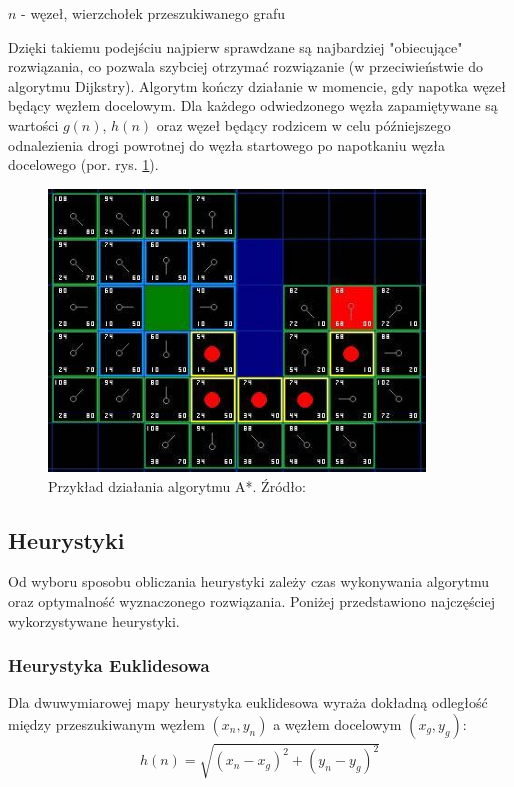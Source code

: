  $n$ - węzeł, wierzchołek przeszukiwanego grafu

Dzięki takiemu podejściu najpierw sprawdzane są najbardziej "obiecujące" rozwiązania, co pozwala szybciej otrzymać rozwiązanie (w przeciwieństwie do algorytmu Dijkstry).
Algorytm kończy działanie w momencie, gdy napotka węzeł będący węzłem docelowym.
Dla każdego odwiedzonego węzła zapamiętywane są wartości $g(n)$, $h(n)$ oraz węzeł będący rodzicem w celu późniejszego odnalezienia drogi powrotnej do węzła startowego po napotkaniu węzła docelowego (por. rys. \ref{fig:image_astar2}).

\begin{figure}[H]
	\centering
	\includegraphics[width=10cm]{img/astar-t7}
	\caption{Przykład działania algorytmu A*. Źródło: \cite{astar2}}
	\label{fig:image_astar2}
\end{figure}

\subsection{Heurystyki}
Od wyboru sposobu obliczania heurystyki zależy czas wykonywania algorytmu oraz optymalność wyznaczonego rozwiązania.
Poniżej przedstawiono najczęściej wykorzystywane heurystyki.

\subsubsection{Heurystyka Euklidesowa}
Dla dwuwymiarowej mapy heurystyka euklidesowa wyraża dokładną odległość między przeszukiwanym węzłem $(x_n, y_n)$ a węzłem docelowym $(x_g, y_g)$:
\begin{gather}
 	h(n) = \sqrt{(x_n - x_g)^2 + (y_n - y_g)^2}
 	\label{eq_astar_heu_euc} 
\end{gather}

